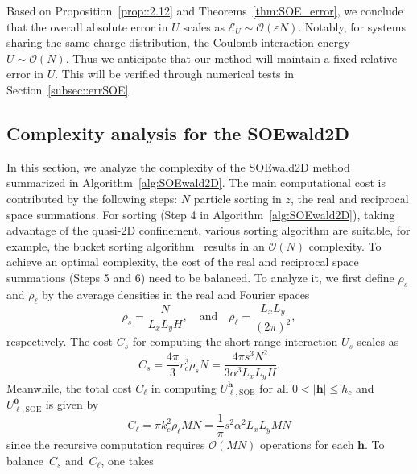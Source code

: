 Based on Proposition~\ref{prop::2.12} and Theorems~\ref{thm:SOE_error}, we conclude that the overall absolute error in $U$ scales as $\mathscr{E}_{U}\sim \mathcal{O}(\varepsilon N)$. 
Notably, for systems sharing the same charge distribution, the Coulomb interaction energy $U \sim \mathcal{O}(N)$. 
Thus we anticipate that our method will maintain a fixed relative error in $U$. 
This will be verified through numerical tests in Section~\ref{subsec::errSOE}.

\subsection{Complexity analysis for the SOEwald2D}
In this section, we analyze the complexity of the SOEwald2D method summarized in Algorithm~\ref{alg:SOEwald2D}. 
The main computational cost is contributed by the following steps: $N$ particle sorting in $z$, the real and reciprocal space summations.
For sorting (Step 4 in Algorithm~\ref{alg:SOEwald2D}), taking advantage of the quasi-2D confinement, various sorting algorithm are suitable, for example, the bucket sorting algorithm~\cite{cormen2022introduction} results in an $\mathcal{O}(N)$ complexity.
To achieve an optimal complexity, the cost of the real and reciprocal space summations (Steps 5 and 6) need to be balanced. 
To analyze it, we first define $\rho_{s}$ and $\rho_{\ell}$ by the average densities in the real and Fourier spaces 
\begin{equation}
	\rho_{s}=\frac{N}{L_x L_y H},\quad \text{and} \quad \rho_{\ell}=\frac{L_xL_y}{(2\pi)^2},
\end{equation}
respectively.
The cost $C_s$ for computing the short-range interaction $U_{s}$ scales as
\begin{equation}\label{eq::cs}
	C_{s}=\frac{4\pi}{3}r_c^3\rho_{s}N=\frac{4\pi s^3N^2}{3\alpha^3 L_x L_y H}.
\end{equation}
Meanwhile, the total cost $ C_{\ell}$ in computing $U_{\ell,\text{SOE}}^{\bm{h}}$ for all $0<|\bm{h}|\leq h_c$ and $U_{\ell,\text{SOE}}^{\bm{0}}$ is given by
\begin{equation}\label{eq::cll}
	C_{\ell} = \pi k_c^2\rho_{\ell}MN = \frac{1}{\pi}s^2 \alpha^2 L_x L_y M N
\end{equation}
since the recursive computation requires $\mathcal{O}(MN)$ operations for each $\bm{h}$. 
To balance~$C_{s}$ and~$C_{\ell}$, one takes
